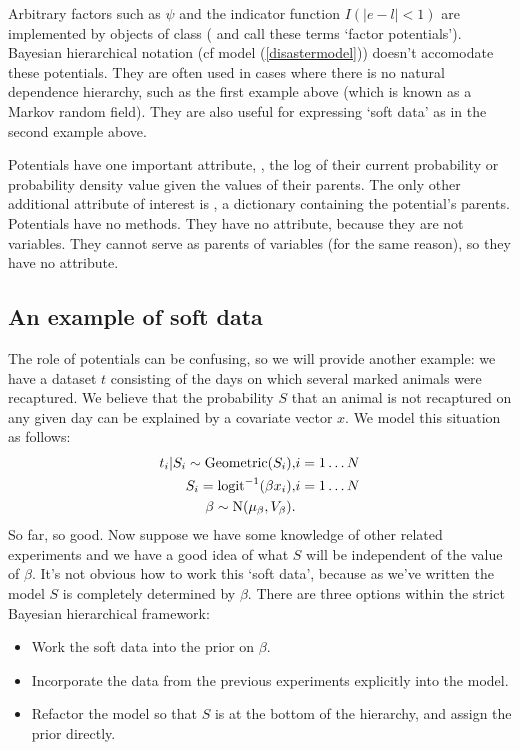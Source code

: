 Arbitrary factors such as $\psi$ and the indicator function $I(|e-l|<1)$ are
implemented by objects of class  (\cite{dawidmarkov} and
\cite{Jordan:2004p5439} call these terms `factor potentials'). Bayesian
hierarchical notation (cf model (\ref{disastermodel})) doesn't accomodate these
potentials. They are often used in cases where there is no natural dependence
hierarchy, such as the first example above (which is known as a Markov random
field). They are also useful for expressing `soft data'
\citep{Christakos:2002p5506} as in the second example above.


\bigskip
Potentials have one important attribute, , the log of their current probability or probability density value given the values of their parents. The only other additional attribute of interest is , a dictionary containing the potential's parents. Potentials have no methods. They have no  attribute, because they are not variables. They cannot serve as parents of variables (for the same reason), so they have no  attribute.

\subsection{An example of soft data}
The role of potentials can be confusing, so we will provide another example: we have a dataset $t$ consisting of the days on which several marked animals were recaptured. We believe that the probability $S$ that an animal is not recaptured on any given day can be explained by a covariate vector $x$. We model this situation as follows:
\begin{eqnarray*}
    t_i|S_i \sim \textup{Geometric}(S_i), & i=1\ldots N\\
    S_i = \textup{logit}^{-1}(\beta x_i), &i=1\ldots N\\
    \beta\sim \textup{N}(\mu_\beta, V_\beta).
\end{eqnarray*}
So far, so good. Now suppose we have some knowledge of other related experiments and we have a good idea of what $S$ will be independent of the value of $\beta$. It's not obvious how to work this `soft data', because as we've written the model $S$ is completely determined by $\beta$. There are three options within the strict Bayesian hierarchical framework:
\begin{itemize}
    \item Work the soft data into the prior on $\beta$.
    \item Incorporate the data from the previous experiments explicitly into the model.
    \item Refactor the model so that $S$ is at the bottom of the hierarchy, and assign the prior directly.
\end{itemize}

